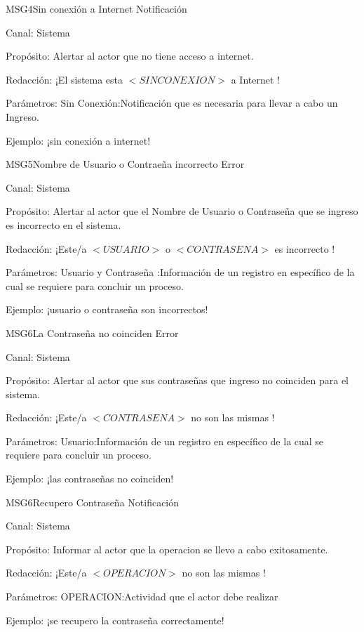 \begin{mensaje}{MSG4}{Sin conexión a Internet }{Notificación \msgNotif}
	\item[Canal:] Sistema
    \item[Propósito:] Alertar al actor que no tiene acceso a internet.
    \item[Redacción:] ¡El sistema esta $<SIN CONEXION>$ a Internet !
    \item[Parámetros:] Sin Conexión:Notificación que es necesaria para llevar a cabo un Ingreso.
    \item[Ejemplo:] ¡sin conexión a internet!
\end{mensaje}
\begin{mensaje}{MSG5}{Nombre de Usuario o Contraeña incorrecto }{Error \msgError}
	\item[Canal:] Sistema
    \item[Propósito:] Alertar al actor que el Nombre de Usuario o Contraseña que se ingreso es incorrecto en el sistema.
    \item[Redacción:] ¡Este/a $<USUARIO>$ o $<CONTRASENA>$ es incorrecto !
    \item[Parámetros:] Usuario y Contraseña :Información de un registro en específico de la cual se requiere para concluir un proceso.
    \item[Ejemplo:] ¡usuario o contraseña son incorrectos!
\end{mensaje}
\begin{mensaje}{MSG6}{La Contraseña no coinciden }{Error \msgError}
	\item[Canal:] Sistema
    \item[Propósito:] Alertar al actor que sus contraseñas que ingreso no coinciden para el sistema.
    \item[Redacción:] ¡Este/a $<CONTRASENA>$ no son las mismas !
    \item[Parámetros:] Usuario:Información de un registro en específico de la cual se requiere para concluir un proceso.
    \item[Ejemplo:] ¡las contraseñas no coinciden!
\end{mensaje}
\begin{mensaje}{MSG6}{Recupero Contraseña }{Notificación \msgNotif}
	\item[Canal:] Sistema
    \item[Propósito:] Informar al actor que la operacion se llevo a cabo exitosamente.
    \item[Redacción:] ¡Este/a $<OPERACION>$ no son las mismas !
    \item[Parámetros:] OPERACION:Actividad que el actor debe realizar
    \item[Ejemplo:] ¡se recupero la contraseña correctamente!
\end{mensaje}
